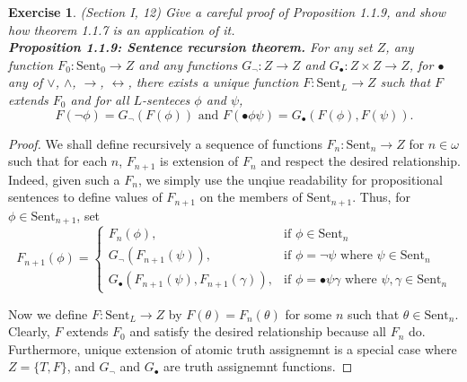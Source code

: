 \documentclass[a4paper, 11pt]{book}
\theoremstyle{plain}
\newtheorem{exercise}{Exercise}[chapter]
\theoremstyle{plain}
\newcommand{\arr}{\rightarrow}
\newcommand{\sent}{\text{Sent}}
\newcommand{\n}{\neg}
\newcommand{\bt}{\bullet}
\newcommand{\lrarr}{\leftrightarrow}
\begin{document}
  \begin{exercise}
    (Section I, 12)
    Give a careful proof of Proposition 1.1.9, and show how theorem 1.1.7 is an application of it. \\

    \textbf{Proposition 1.1.9: Sentence recursion theorem.} For any set $Z$, any function $F_0: \sent_0 \arr Z$ and any functions $G_\n: Z \arr Z$ and $G_\bt: Z \times Z \arr Z$, for $\bt $ any of $\lor$, $\land$, $\arr$, $\lrarr $, there exists a unique function $F: \sent_L \arr Z$ such that $F$ extends $F_0$ and for all $L$-senteces $\phi$ and $\psi$, $$F( \n \phi)= G_\n (F(\phi)) \text{ and } F(\bt \phi \psi)=G_\bt (F(\phi), F(\psi)).$$
  \end{exercise}
  \begin{proof}
    We shall define recursively a sequence of functions $F_n: \sent_n \arr Z$ for $n \in \omega$ such that for each $n$, $F_{n+1}$ is extension of $F_n$ and respect the desired relationship. Indeed, given such a $F_n$, we simply use the unqiue readability for propositional sentences to define values of $F_{n+1}$ on the members of $\sent_{n+1}$. Thus, for $\phi \in \sent_{n+1}$, set 
    $$ F_{n+1}(\phi) = 
      \begin{cases}
      F_n(\phi), & \text{if } \phi \in \sent_n \\
      G_\n (F_{n+1} (\psi)), & \text{if } \phi= \neg \psi \text{ where } \psi \in \sent_n \\
      G_\bt (F_{n+1}(\psi), F_{n+1}(\gamma)), & \text{if } \phi= \bt \psi \gamma \text{ where } \psi, \gamma \in \sent_n
      \end{cases} $$

    Now we define $F: \sent_L \arr Z$ by $F(\theta)=F_n(\theta)$ for some $n$ such that $\theta \in \sent_n$. Clearly, $F$ extends $F_0$ and satisfy the desired relationship because all $F_n$ do. Furthermore, unique extension of atomic truth assignemnt is a special case where $Z=\{T, F\}$, and $G_\n$ and $G_\bt$ are truth assignemnt functions.
  \end{proof}
\end{document}

